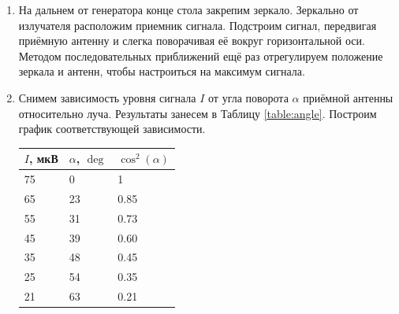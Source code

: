 \documentclass[a4paper, 12pt]{article}
\begin{document}
\begin{enumerate}
    \item На дальнем от генератора конце стола закрепим зеркало. Зеркально от излучателя расположим приемник сигнала. Подстроим сигнал, передвигая приёмную антенну и слегка поворачивая её вокруг горизонтальной оси. Методом последовательных приближений ещё раз отрегулируем положение зеркала и антенн, чтобы настроиться на максимум сигнала.
    \item Снимем зависимость уровня сигнала $I$ от угла поворота $\alpha$ приёмной антенны относительно луча. Результаты занесем в Таблицу \ref{table:angle}. Построим график соответствующей зависимости.
    
    \begin{minipage}{0.4\textwidth}
        \begin{tabular}{|l|l|l|}
        \hline
        $I$, мкВ & $\alpha$, $\deg$ & $\cos^2\left(\alpha\right)$ \\ \hline
        75       & 0        & 1                          \\ \hline
        65       & 23       & 0.85                       \\ \hline
        55       & 31       & 0.73                       \\ \hline
        45       & 39       & 0.60                       \\ \hline
        35       & 48       & 0.45                       \\ \hline
        25       & 54       & 0.35                       \\ \hline
        21       & 63       & 0.21                       \\ \hline
        \end{tabular}
        \label{table:angle}
    \end{minipage}
    \begin{minipage}{0.6\textwidth}
        \begin{center}
        \end{center}
    \end{minipage}
\end{enumerate}
    
\end{document}
